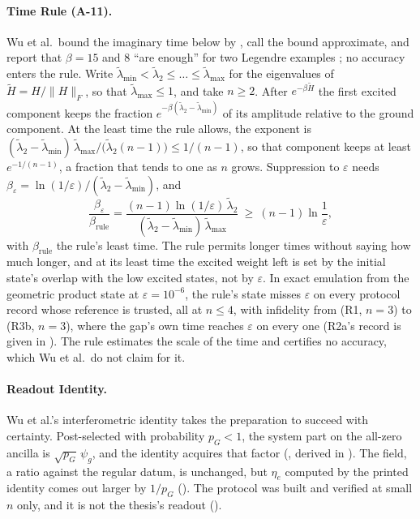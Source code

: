 \paragraph{Time Rule (A-11).} Wu et al.\ bound the imaginary time below by , call the bound approximate, and report that $\beta=15$ and $8$ ``are enough'' for two Legendre examples \cite{wu2025pihm}; no accuracy enters the rule. Write $\tilde\lambda_{\min}<\tilde\lambda_2\le\dots\le\tilde\lambda_{\max}$ for the eigenvalues of $\tilde H=H/\|H\|_F$, so that $\tilde\lambda_{\max}\le1$, and take $n\ge2$. After $e^{-\beta\tilde H}$ the first excited component keeps the fraction $e^{-\beta(\tilde\lambda_2-\tilde\lambda_{\min})}$ of its amplitude relative to the ground component. At the least time the rule allows, the exponent is $(\tilde\lambda_2-\tilde\lambda_{\min})\,\tilde\lambda_{\max}/\bigl(\tilde\lambda_2(n-1)\bigr)\le1/(n-1)$, so that component keeps at least $e^{-1/(n-1)}$, a fraction that tends to one as $n$ grows. Suppression to $\varepsilon$ needs $\beta_\varepsilon=\ln(1/\varepsilon)/(\tilde\lambda_2-\tilde\lambda_{\min})$, and
\begin{equation}
    \frac{\beta_\varepsilon}{\beta_{\mathrm{rule}}}=\frac{(n-1)\ln(1/\varepsilon)\,\tilde\lambda_2}{(\tilde\lambda_2-\tilde\lambda_{\min})\,\tilde\lambda_{\max}}\ \ge\ (n-1)\ln\frac1\varepsilon ,
    \label{eq:time-rule-shortfall}
\end{equation}
with $\beta_{\mathrm{rule}}$ the rule's least time. The rule permits longer times without saying how much longer, and at its least time the excited weight left is set by the initial state's overlap with the low excited states, not by $\varepsilon$. In exact emulation from the geometric product state at $\varepsilon=10^{-6}$, the rule's state misses $\varepsilon$ on every protocol record whose reference is trusted, all at $n\le4$, with infidelity from  (R1, $n=3$) to  (R3b, $n=3$), where the gap's own time reaches $\varepsilon$ on every one (R2a's record is given in ). The rule estimates the scale of the time and certifies no accuracy, which Wu et al.\ do not claim for it.

\paragraph{Readout Identity.} Wu et al.'s interferometric identity takes the preparation to succeed with certainty. Post-selected with probability $p_G<1$, the system part on the all-zero ancilla is $\sqrt{p_G}\,\psi_g$, and the identity acquires that factor (, derived in ). The field, a ratio against the regular datum, is unchanged, but $\eta_e$ computed by the printed identity comes out larger by $1/p_G$ (). The protocol was built and verified at small $n$ only, and it is not the thesis's readout ().

